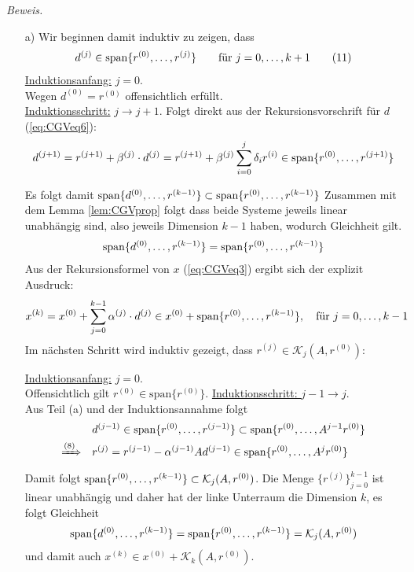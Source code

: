 \textit{Beweis.} 
\begin{enumerate}
  \item[a)] Wir beginnen damit induktiv zu zeigen, dass 
  \begin{align*}
    d^{(j)}\in\operatorname*{span}\{r^{(0)}, \dots, r^{(j)}\} \qquad \text{für } j=0,\dots,k+1 
    \tag{11}\label{eq:CGVeq11}
  \end{align*}
  \underline{Induktionsanfang:} $j=0$. \\
  Wegen $d^{(0)}=r^{(0)}$ offensichtlich erfüllt.  \\
  \underline{Induktionsschritt:} $j\rightarrow j+1$. Folgt direkt aus der Rekursionsvorschrift für $d$ 
  (\ref{eq:CGVeq6}):
  \begin{align*}
    d^{(j+1)} 
    = r^{(j+1)} + \beta^{(j)}\cdot d^{(j)} 
    = r^{(j+1)} + \beta^{(j)}\sum_{i=0}^{j}\delta_i r^{(i)}
    \in \operatorname*{span}\{r^{(0)}, \dots, r^{(j+1)}\}
  \end{align*}

  Es folgt damit $\operatorname*{span}\{d^{(0)}, \dots, r^{(k-1)}\}\subset\operatorname*{span}\{r^{(0)}, \dots, r^{(k-1)}\}$
  Zusammen mit dem Lemma \ref{lem:CGVprop} folgt dass beide Systeme jeweils linear unabhängig sind, also jeweils 
  Dimension $k-1$ haben, wodurch Gleichheit gilt.
  \begin{align*}
    \operatorname*{span}\{d^{(0)}, \dots, r^{(k-1)}\} = \operatorname*{span}\{r^{(0)}, \dots, r^{(k-1)}\}
  \end{align*}
  Aus der Rekursionsformel von $x$ (\ref{eq:CGVeq3}) ergibt sich der explizit Ausdruck:
  \begin{align*}
    x^{(k)} 
    = x^{(0)} + \sum_{j=0}^{k-1} \alpha^{(j)}\cdot d^{(j)} 
    \in x^{(0)} + \operatorname*{span}\{r^{(0)}, \dots, r^{(k-1)}\},
    \quad\text{für } j=0,\dots,k-1
  \end{align*}
  Im nächsten Schritt wird induktiv gezeigt, dass $r^{(j)}\in \mathcal{K}_j(A,r^{(0)})$: 

  \underline{Induktionsanfang:} $j=0$. \\
  Offensichtlich gilt $r^{(0)}\in\text{span}\{r^{(0)}\}$.
  \underline{Induktionsschritt: } $j-1\rightarrow j$.\\
  Aus Teil (a) und der Induktionsannahme folgt 
  \begin{align*}
  & d^{(j-1)}\in\text{span}\{r^{(0)}, \dots, r^{(j-1)}\}
  \subset \text{span}\{r^{(0)}, \dots, A^{j-1}r^{(0)}\} \\
  \xRightarrow{(8)} \quad
  & r^{(j)} = r^{(j-1)}-\alpha^{(j-1)}Ad^{(j-1)}
  \in \text{span}\{r^{(0)}, \dots, A^{j}r^{(0)}\}
  \end{align*}
  Damit folgt $\operatorname*{span}\{r^{(0)},\dots,r^{(k-1)}\}\subset \mathcal{K}_j(A,r^{(0)})$. 
  Die Menge $\{r^{(j)}\}_{j=0}^{k-1}$ ist linear unabhängig und daher hat der linke Unterraum die Dimension $k$, 
  es folgt Gleichheit 
  \begin{align*}
      \operatorname*{span}\{d^{(0)}, \dots, r^{(k-1)}\} = \operatorname*{span}\{r^{(0)}, \dots, r^{(k-1)}\} = \mathcal{K}_j(A,r^{(0)})
  \end{align*}
  und damit auch $x^{(k)}\in x^{(0)} + \mathcal{K}_k(A,r^{(0)})$.


\end{enumerate}
